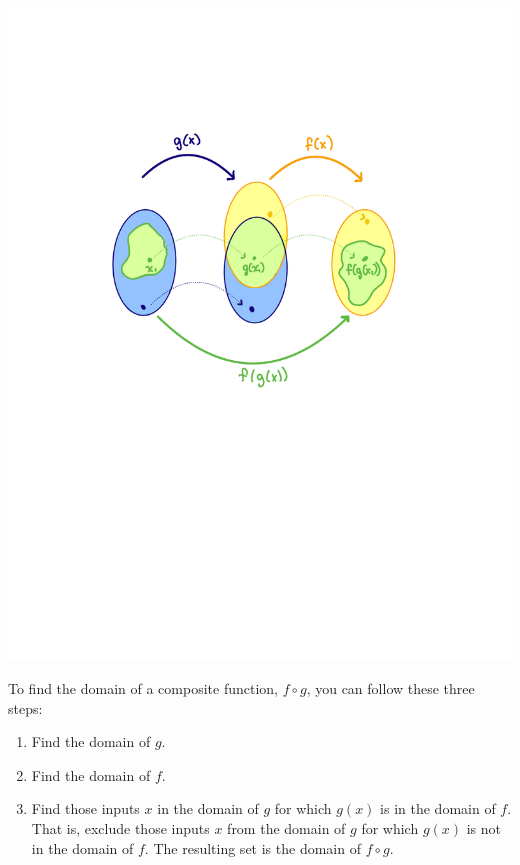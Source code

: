 \documentclass{ximera}
\begin{document}
\begin{image}
\includegraphics{CompDom1}
\end{image}



To find the domain of a composite function, $f\circ g$, you can follow these three steps:
\begin{enumerate}[label=\arabic*)]
\item Find the domain of $g$.
\item Find the domain of $f$.
\item Find those inputs $x$ in the domain of $g$ for which $g(x)$ is in the domain of $f$.  That is, exclude those inputs $x$ from the domain of $g$ for which $g(x)$ is not in the domain of $f$.  The resulting set is the domain of $f \circ g$.  
\end{enumerate} 
\end{document}
